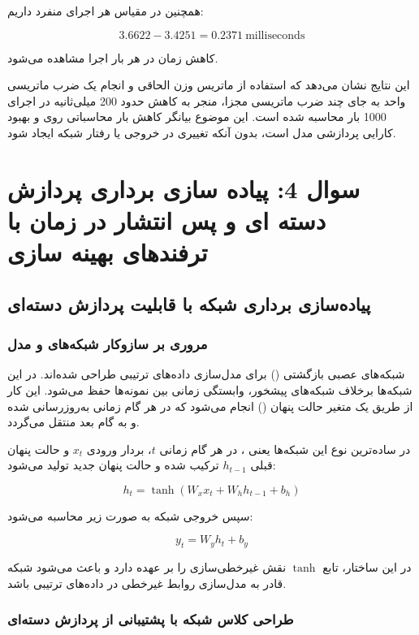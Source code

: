 \documentclass{article}
\begin{document}
همچنین در مقیاس هر اجرای منفرد داریم:

\[
3.6622 - 3.4251 = 0.2371 \ \text{milliseconds}
\]

کاهش زمان در هر بار اجرا مشاهده می‌شود.

این نتایج نشان می‌دهد که استفاده از ماتریس وزن الحاقی و انجام یک ضرب ماتریسی واحد به جای چند ضرب ماتریسی مجزا، منجر به کاهش حدود 200 میلی‌ثانیه در اجرای 1000 بار محاسبه شده است. این موضوع بیانگر کاهش بار محاسباتی روی  و بهبود کارایی پردازشی مدل است، بدون آنکه تغییری در خروجی یا رفتار شبکه ایجاد شود.

\newpage
\section{سوال 4: پیاده سازی برداری پردازش دسته ای و پس انتشار در زمان با ترفندهای بهینه سازی}
\subsection{پیاده‌سازی برداری شبکه  با قابلیت پردازش دسته‌ای }

\subsubsection{مروری بر سازوکار شبکه‌های  و مدل }

شبکه‌های عصبی بازگشتی () برای مدل‌سازی داده‌های ترتیبی طراحی شده‌اند. در این شبکه‌ها برخلاف شبکه‌های پیشخور، وابستگی زمانی بین نمونه‌ها حفظ می‌شود. این کار از طریق یک متغیر حالت پنهان () انجام می‌شود که در هر گام زمانی به‌روزرسانی شده و به گام بعد منتقل می‌گردد.

در ساده‌ترین نوع این شبکه‌ها یعنی ، در هر گام زمانی $t$، بردار ورودی $x_t$ و حالت پنهان قبلی $h_{t-1}$ ترکیب شده و حالت پنهان جدید تولید می‌شود:

\[
h_t = \tanh(W_x x_t + W_h h_{t-1} + b_h)
\]

سپس خروجی شبکه به صورت زیر محاسبه می‌شود:

\[
y_t = W_y h_t + b_y
\]

در این ساختار، تابع $\tanh$ نقش غیرخطی‌سازی را بر عهده دارد و باعث می‌شود شبکه قادر به مدل‌سازی روابط غیرخطی در داده‌های ترتیبی باشد.

\subsubsection{طراحی کلاس شبکه با پشتیبانی از پردازش دسته‌ای}
\end{document}

